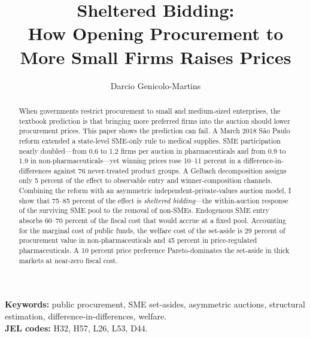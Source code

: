 \documentclass[12pt]{elsarticle}
\begin{document}
\begin{frontmatter}
\title{\textbf{Sheltered Bidding:\\ How Opening Procurement to More Small Firms Raises Prices}}
\author[INSPER]{Darcio Genicolo-Martins}
\address[INSPER]{INSPER, S\~ao Paulo}

\begin{abstract}
When governments restrict procurement to small and medium-sized enterprises, the textbook prediction is that bringing more preferred firms into the auction should lower procurement prices. This paper shows the prediction can fail. A March 2018 S\~ao Paulo reform extended a state-level SME-only rule to medical supplies. SME participation nearly doubled---from 0.6 to 1.2 firms per auction in pharmaceuticals and from 0.9 to 1.9 in non-pharmaceuticals---yet winning prices rose 10--11 percent in a difference-in-differences against 76 never-treated product groups. A Gelbach decomposition assigns only 5 percent of the effect to observable entry and winner-composition channels. Combining the reform with an asymmetric independent-private-values auction model, I show that 75--85 percent of the effect is \emph{sheltered bidding}---the within-auction response of the surviving SME pool to the removal of non-SMEs. Endogenous SME entry absorbs 60--70 percent of the fiscal cost that would accrue at a fixed pool. Accounting for the marginal cost of public funds, the welfare cost of the set-aside is 29 percent of procurement value in non-pharmaceuticals and 45 percent in price-regulated pharmaceuticals. A 10 percent price preference Pareto-dominates the set-aside in thick markets at near-zero fiscal cost.
\end{abstract}
\end{frontmatter}

\textbf{Keywords:} public procurement, SME set-asides, asymmetric auctions, structural estimation, difference-in-differences, welfare.\\
\textbf{JEL codes:} H32, H57, L26, L53, D44.














\clearpage




\end{document}
